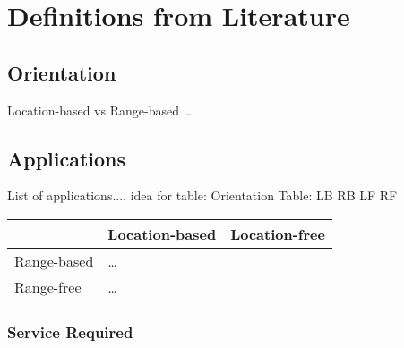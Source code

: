 \section{Definitions from Literature}

  \subsection{Orientation}
  Location-based vs Range-based \ldots
  \subsection{Applications}
  List of applications.... idea for table: Orientation Table: LB RB LF RF\\
  
  \begin{tabular}{|p{3cm}|p{3cm}|p{3cm}|}
    \hline
     & Location-based & Location-free\\\hline
    Range-based & \ldots & \\\hline
    Range-free & \ldots & \\
    \hline
  \end{tabular}
  
  \subsubsection{Service Required}
  